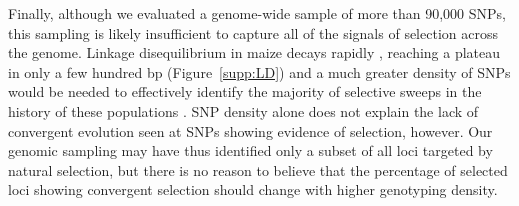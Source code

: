 Finally, although we evaluated a genome-wide sample of more than 90,000 SNPs, this sampling is likely insufficient to capture all of the signals of selection across the genome.  
Linkage disequilibrium in maize decays rapidly \citep{Chia_2012_22660545}, reaching a plateau in only a few hundred bp (Figure~\ref{supp:LD}) and a much greater density of SNPs would be needed to effectively identify the majority of selective sweeps in the history of these populations \cite[]{tiffin2014advances}.
SNP density alone does not explain the lack of convergent evolution seen at SNPs showing evidence of selection, however.  
Our genomic sampling may have thus identified only a subset of all loci targeted by natural selection, but there is no reason to believe that the percentage of selected loci showing convergent selection should change with higher genotyping density. 











